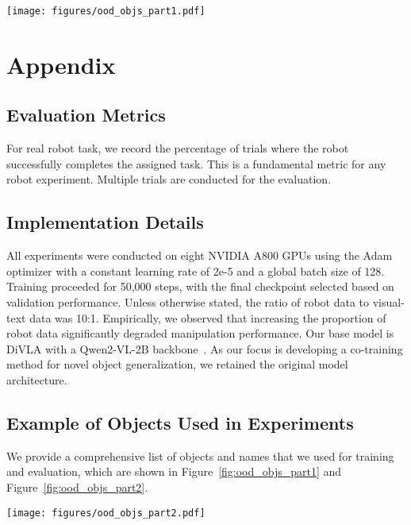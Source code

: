 \begin{figure*}[h]
    \centering
    \texttt{[image: figures/ood\_objs\_part1.pdf]}
    \caption{The out-of-distribution objects used in our experiments (part 1).}\label{fig:ood_objs_part1}
\end{figure*}

\section{Appendix}
\label{sec:appendix}

\subsection{Evaluation Metrics}
For real robot task, we record the percentage of trials where the robot successfully completes the assigned task. This is a fundamental metric for any robot experiment. Multiple trials are conducted for the evaluation.


\subsection{Implementation Details}
All experiments were conducted on eight NVIDIA A800 GPUs using the Adam optimizer with a constant learning rate of 2e-5 and a global batch size of 128.  Training proceeded for 50,000 steps, with the final checkpoint selected based on validation performance. Unless otherwise stated, the ratio of robot data to visual-text data was 10:1.  Empirically, we observed that increasing the proportion of robot data significantly degraded manipulation performance.  Our base model is DiVLA\cite{wen2024diffusionvla} with a Qwen2-VL-2B backbone~\cite{wang2024qwen2}. As our focus is developing a co-training method for novel object generalization, we retained the original model architecture.


\subsection{Example of Objects Used in Experiments}
We provide a comprehensive list of  objects and names that we used for training and evaluation, which are shown in Figure~\ref{fig:ood_objs_part1} and Figure~\ref{fig:ood_objs_part2}.



\begin{figure*}[t]
    \centering
    \texttt{[image: figures/ood\_objs\_part2.pdf]}
    \caption{The out-of-distribution objects used in our experiments (part 2).}\label{fig:ood_objs_part2}
\end{figure*}